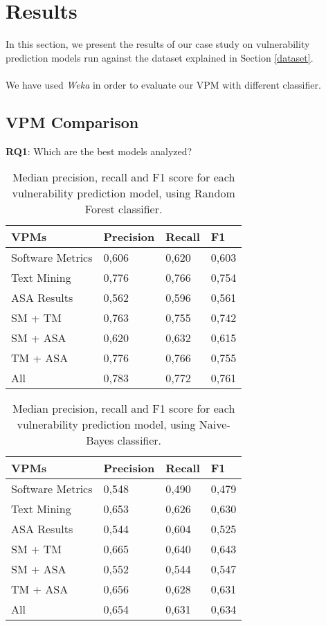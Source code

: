 \documentclass[twocolumn,10pt]{asme2ej}
\begin{document}
\section{Results}
In this section, we present the results of our case study on vulnerability prediction models run against the dataset explained in Section \ref{dataset}.\\
\\We have used \textit{Weka} in order to evaluate our VPM with different classifier. 
\subsection{VPM Comparison}
\textbf{RQ1}: Which are the best models analyzed?
\begin{table}[h]
\label{tab:RF_result}
\centering
\caption{Median precision, recall and F1 score for each vulnerability prediction model, using Random Forest classifier.}
\begin{tabular}{|l|l|l|l|} 
\hline
VPMs             & Precision & Recall & F1  \\ 
\hline
Software Metrics &      0,606     &   0,620     &  0,603  \\
Text Mining      &      0,776     &   0,766     &  0,754   \\
ASA Results      &      0,562     &   0,596     &  0,561   \\
SM + TM          &      0,763     &   0,755     &  0,742   \\
SM + ASA         &      0,620     &   0,632     &  0,615   \\
TM + ASA         &      0,776     &   0,766     &  0,755   \\
All              &      0,783     &   0,772     &  0,761   \\
\hline
\end{tabular}
\end{table}

\begin{table}[h]
\label{tab:NB_result}
\centering
\caption{Median precision, recall and F1 score for each vulnerability prediction model, using Naive-Bayes classifier.}
\begin{tabular}{|l|l|l|l|} 
\hline
VPMs             & Precision & Recall & F1  \\ 
\hline
Software Metrics &      0,548    &   0,490   &  0,479  \\
Text Mining      &      0,653    &   0,626   &  0,630 \\
ASA Results      &      0,544    &   0,604   &  0,525   \\
SM + TM          &      0,665    &   0,640   &  0,643 \\
SM + ASA         &      0,552    &   0,544   &  0,547    \\
TM + ASA         &      0,656    &   0,628   &  0,631   \\
All              &      0,654    &   0,631   &  0,634   \\
\hline
\end{tabular}
\end{table}
\end{document}
